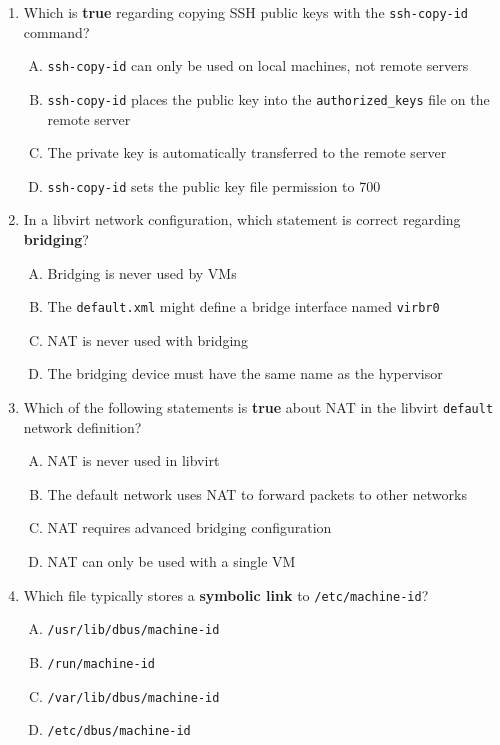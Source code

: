 \documentclass[a4paper]{report}
\begin{document}
\begin{enumerate}[1.]
    \item Which is \textbf{true} regarding copying SSH public keys with the \texttt{ssh-copy-id} command?  
    \begin{enumerate}[A)]
        \item \texttt{ssh-copy-id} can only be used on local machines, not remote servers  
        \item \texttt{ssh-copy-id} places the public key into the \texttt{authorized\_keys} file on the remote server  
        \item The private key is automatically transferred to the remote server  
        \item \texttt{ssh-copy-id} sets the public key file permission to 700  
    \end{enumerate}

    \item In a libvirt network configuration, which statement is correct regarding \textbf{bridging}?  
    \begin{enumerate}[A)]
        \item Bridging is never used by VMs  
        \item The \texttt{default.xml} might define a bridge interface named \texttt{virbr0}  
        \item NAT is never used with bridging  
        \item The bridging device must have the same name as the hypervisor  
    \end{enumerate}

    \item Which of the following statements is \textbf{true} about NAT in the libvirt \texttt{default} network definition?  
    \begin{enumerate}[A)]
        \item NAT is never used in libvirt  
        \item The default network uses NAT to forward packets to other networks  
        \item NAT requires advanced bridging configuration  
        \item NAT can only be used with a single VM  
    \end{enumerate}

    \item Which file typically stores a \textbf{symbolic link} to \texttt{/etc/machine-id}?  
    \begin{enumerate}[A)]
        \item \texttt{/usr/lib/dbus/machine-id}  
        \item \texttt{/run/machine-id}  
        \item \texttt{/var/lib/dbus/machine-id}  
        \item \texttt{/etc/dbus/machine-id}  
    \end{enumerate}


\end{enumerate}
\end{document}
